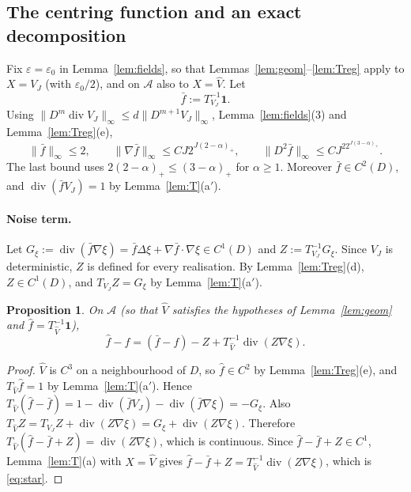 \documentclass[11pt]{article}
\newtheorem{proposition}[theorem]{Proposition}
\theoremstyle{definition}
\theoremstyle{remark}
\newcommand{\one}{\mathbf 1}
\newcommand{\dv}{\operatorname{div}}
\newcommand{\cA}{\mathcal A}
\begin{document}
\subsection{The centring function and an exact decomposition}

Fix $\varepsilon=\varepsilon_0$ in Lemma~\ref{lem:fields}, so that Lemmas~\ref{lem:geom}--\ref{lem:Treg} apply to $X=V_J$ (with $\varepsilon_0/2$), and on $\cA$ also to $X=\hat V$. Let
\[
\bar f:=T^{-1}_{V_J}\one .
\]
Using $\|D^m\dv V_J\|_\infty\le d\|D^{m+1}V_J\|_\infty$, Lemma~\ref{lem:fields}(3) and Lemma~\ref{lem:Treg}(e),
\begin{equation}\label{eq:fbar}
\|\bar f\|_\infty\le2,\qquad\|\nabla\bar f\|_\infty\le CJ2^{J(2-\alpha)_+},\qquad\|D^2\bar f\|_\infty\le CJ^22^{J(3-\alpha)_+} .
\end{equation}
The last bound uses $2(2-\alpha)_+\le(3-\alpha)_+$ for $\alpha\ge1$. Moreover $\bar f\in C^2(D)$, and $\dv(\bar fV_J)=1$ by Lemma~\ref{lem:T}(a$'$).

\paragraph{Noise term.} Let $G_\xi:=\dv(\bar f\nabla\xi)=\bar f\Delta\xi+\nabla\bar f\cdot\nabla\xi\in C^1(D)$ and $Z:=T^{-1}_{V_J}G_\xi$. Since $V_J$ is deterministic, $Z$ is defined for every realisation. By Lemma~\ref{lem:Treg}(d), $Z\in C^1(D)$, and $T_{V_J}Z=G_\xi$ by Lemma~\ref{lem:T}(a$'$).

\begin{proposition}\label{prop:star}
On $\cA$ (so that $\hat V$ satisfies the hypotheses of Lemma~\ref{lem:geom} and $\hat f=T^{-1}_{\hat V}\one$),
\begin{equation}\label{eq:star}
\hat f-f=(\bar f-f)-Z+T^{-1}_{\hat V}\dv(Z\nabla\xi).
\end{equation}
\end{proposition}

\begin{proof}
$\hat V$ is $C^3$ on a neighbourhood of $D$, so $\hat f\in C^2$ by Lemma~\ref{lem:Treg}(e), and $T_{\hat V}\hat f=1$  by Lemma~\ref{lem:T}(a$'$). Hence
$T_{\hat V}(\hat f-\bar f)=1-\dv(\bar fV_J)-\dv(\bar f\nabla\xi)=-G_\xi$.
Also $T_{\hat V}Z=T_{V_J}Z+\dv(Z\nabla\xi)=G_\xi+\dv(Z\nabla\xi)$. Therefore $T_{\hat V}(\hat f-\bar f+Z)=\dv(Z\nabla\xi)$, which is continuous. Since $\hat f-\bar f+Z\in C^1$, Lemma~\ref{lem:T}(a) with $X=\hat V$ gives $\hat f-\bar f+Z=T^{-1}_{\hat V}\dv(Z\nabla\xi)$, which is \eqref{eq:star}.
\end{proof}
\end{document}
